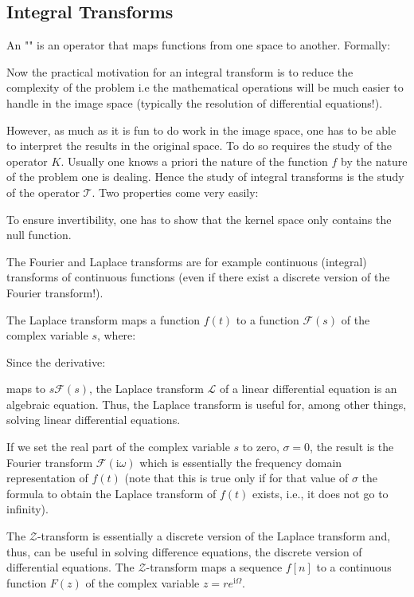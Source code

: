 	\pagebreak
	\subsection{Integral Transforms}
	An "" is an operator that maps functions from one space to another. Formally:
	
	Now the practical motivation for an integral transform is to reduce the complexity of the problem i.e the mathematical operations will be much easier to handle in the image space (typically the resolution of differential equations!).
	
	However, as much as it is fun to do work in the image space, one has to be able to interpret the results in the original space. To do so requires the study of the operator $K$. Usually one knows a priori the nature of the function $f$ by the nature of the problem one is dealing. Hence the study of integral transforms is the study of the operator $\mathcal{T}$. Two properties come very easily:
	
	To ensure invertibility, one has to show that the kernel space only contains the null function.

	The Fourier and Laplace transforms are for example continuous (integral) transforms of continuous functions (even if there exist a discrete version of the Fourier transform!).

	The Laplace transform maps a function $f(t)$ to a function $\mathcal{F}(s)$ of the complex variable $s$, where:
	
	Since the derivative:
	
	maps to $s\mathcal{F}(s)$, the Laplace transform $\mathcal{L}$ of a linear differential equation is an algebraic equation. Thus, the Laplace transform is useful for, among other things, solving linear differential equations.
	
	If we set the real part of the complex variable $s$ to zero, $\sigma=0$, the result is the Fourier transform $\mathcal{F}(\mathrm{i}\omega)$ which is essentially the frequency domain representation of $f(t)$ (note that this is true only if for that value of $\sigma$ the formula to obtain the Laplace transform of $f(t)$ exists, i.e., it does not go to infinity).
	
	The $\mathcal{Z}$-transform is essentially a discrete version of the Laplace transform and, thus, can be useful in solving difference equations, the discrete version of differential equations. The $\mathcal{Z}$-transform maps a sequence $f[n]$ to a continuous function $F(z)$ of the complex variable $z=re^{\mathrm{i}\Omega}$.
	
